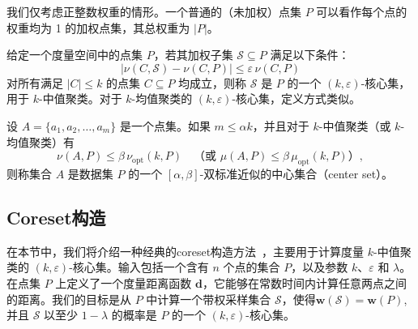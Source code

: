\documentclass[lang=cn,newtx,10pt,scheme=chinese,chinesefont=nofont,citestyle=gb7714-2015, bibstyle=gb7714-2015]{elegantbook}
\begin{document}
\begin{refsection}
\begin{remark}
我们仅考虑正整数权重的情形。一个普通的（未加权）点集 $P$ 可以看作每个点的权重均为 1 的加权点集，其总权重为 $|P|$。
\end{remark}

\begin{definition}
给定一个度量空间中的点集 $P$，若其加权子集 $\mathcal{S} \subseteq P$ 满足以下条件：
\[
\bigl| \nu(C, \mathcal{S}) - \nu(C, P) \bigr| \le \varepsilon \, \nu(C, P)
\]
对所有满足 $|C| \le k$ 的点集 $C \subseteq P$ 均成立，则称 $\mathcal{S}$ 是 $P$ 的一个 $(k,\varepsilon)$-核心集，用于 $k$-中值聚类。对于 $k$-均值聚类的 $(k,\varepsilon)$-核心集，定义方式类似。
\end{definition}


\begin{definition}
设  $A = \{a_1, a_2, \dots, a_m\}$
是一个点集。如果 $m \le \alpha k$，并且对于 $k$-中值聚类（或 $k$-均值聚类）有
\[
\nu(A, P) \le \beta \, \nu_{\mathrm{opt}}(k, P) 
\quad \text{（或 } \mu(A, P) \le \beta \, \mu_{\mathrm{opt}}(k, P) \text{）},
\]
则称集合 $A$ 是数据集 $P$ 的一个 $[\alpha,\beta]$-双标准近似的中心集合（center set）。
\end{definition}






\subsection{Coreset构造}
\label{sec:coreset-con}

在本节中，我们将介绍一种经典的coreset构造方法~\cite{chen2009coresets}，主要用于计算度量 $k$-中值聚类的 $(k, \varepsilon)$-核心集。输入包括一个含有 $n$ 个点的集合 $P$，以及参数 $k$、$\varepsilon$ 和 $\lambda$。在点集 $P$ 上定义了一个度量距离函数 $\mathbf{d}$，它能够在常数时间内计算任意两点之间的距离。我们的目标是从 $P$ 中计算一个带权采样集合 $\mathcal{S}$，使得$\mathbf{w}(\mathcal{S}) = \mathbf{w}(P)$, 并且 $\mathcal{S}$ 以至少 $1 - \lambda$ 的概率是 $P$ 的一个 $(k, \varepsilon)$-核心集。


\end{refsection}
\end{document}
